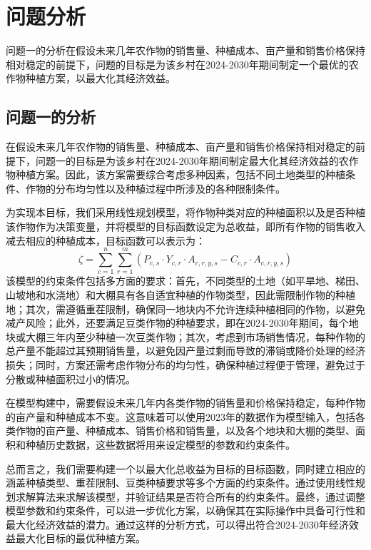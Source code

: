 \documentclass{cumcmthesis}
\begin{document}
\section{问题分析}
问题一的分析在假设未来几年农作物的销售量、种植成本、亩产量和销售价格保持相对稳定的前提下，问题的目标是为该乡村在2024-2030年期间制定一个最优的农作物种植方案，以最大化其经济效益。
\subsection{问题一的分析}
在假设未来几年农作物的销售量、种植成本、亩产量和销售价格保持相对稳定的前提下，问题一的目标是为该乡村在2024-2030年期间制定最大化其经济效益的农作物种植方案。因此，该方案需要综合考虑多种因素，包括不同土地类型的种植条件、作物的分布均匀性以及种植过程中所涉及的各种限制条件。

为实现本目标，我们采用线性规划模型，将作物种类对应的种植面积以及是否种植该作物作为决策变量，并将模型的目标函数设定为总收益，即所有作物的销售收入减去相应的种植成本，目标函数可以表示为：
\begin{equation}
    \zeta = \sum_{c=1}^{n} \sum_{r=1}^{m} (P_{c,s} \cdot Y_{c,r} \cdot A_{c,r,y,s} - C_{c,r} \cdot A_{c,r,y,s})
\end{equation}
该模型的约束条件包括多方面的要求：首先，不同类型的土地（如平旱地、梯田、山坡地和水浇地）和大棚具有各自适宜种植的作物类型，因此需限制作物的种植地；其次，需遵循重茬限制，确保同一地块内不允许连续种植相同的作物，以避免减产风险；此外，还要满足豆类作物的种植要求，即在2024-2030年期间，每个地块或大棚三年内至少种植一次豆类作物；其次，考虑到市场销售情况，每种作物的总产量不能超过其预期销售量，以避免因产量过剩而导致的滞销或降价处理的经济损失；同时，方案还需考虑作物分布的均匀性，确保种植过程便于管理，避免过于分散或种植面积过小的情况。

在模型构建中，需要假设未来几年内各类作物的销售量和价格保持稳定，每种作物的亩产量和种植成本不变。这意味着可以使用2023年的数据作为模型输入，包括各类作物的亩产量、种植成本、销售价格和销售量，以及各个地块和大棚的类型、面积和种植历史数据，这些数据将用来设定模型的参数和约束条件。

总而言之，我们需要构建一个以最大化总收益为目标的目标函数，同时建立相应的涵盖种植类型、重茬限制、豆类种植要求等多个方面的约束条件。通过使用线性规划求解算法来求解该模型，并验证结果是否符合所有的约束条件。最终，通过调整模型参数和约束条件，可以进一步优化方案，以确保其在实际操作中具备可行性和最大化经济效益的潜力。通过这样的分析方式，可以得出符合2024-2030年经济效益最大化目标的最优种植方案。
\end{document}
